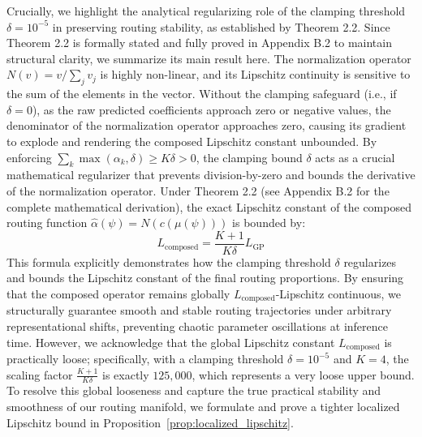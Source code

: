 Crucially, we highlight the analytical regularizing role of the clamping threshold $\delta = 10^{-5}$ in preserving routing stability, as established by Theorem 2.2. Since Theorem 2.2 is formally stated and fully proved in Appendix B.2 to maintain structural clarity, we summarize its main result here. The normalization operator $N(v) = v / \sum_j v_j$ is highly non-linear, and its Lipschitz continuity is sensitive to the sum of the elements in the vector. Without the clamping safeguard (i.e., if $\delta = 0$), as the raw predicted coefficients approach zero or negative values, the denominator of the normalization operator approaches zero, causing its gradient to explode and rendering the composed Lipschitz constant unbounded. By enforcing $\sum_k \max(\alpha_k, \delta) \ge K \delta > 0$, the clamping bound $\delta$ acts as a crucial mathematical regularizer that prevents division-by-zero and bounds the derivative of the normalization operator. Under Theorem 2.2 (see Appendix B.2 for the complete mathematical derivation), the exact Lipschitz constant of the composed routing function $\hat{\alpha}(\psi) = N(c(\mu(\psi)))$ is bounded by:
\begin{equation}
L_{\text{composed}} = \frac{K+1}{K \delta} L_{\text{GP}}
\label{eq:composed_lipschitz}
\end{equation}
This formula explicitly demonstrates how the clamping threshold $\delta$ regularizes and bounds the Lipschitz constant of the final routing proportions. By ensuring that the composed operator remains globally $L_{\text{composed}}$-Lipschitz continuous, we structurally guarantee smooth and stable routing trajectories under arbitrary representational shifts, preventing chaotic parameter oscillations at inference time. However, we acknowledge that the global Lipschitz constant $L_{\text{composed}}$ is practically loose; specifically, with a clamping threshold $\delta = 10^{-5}$ and $K=4$, the scaling factor $\frac{K+1}{K \delta}$ is exactly $125,000$, which represents a very loose upper bound. To resolve this global looseness and capture the true practical stability and smoothness of our routing manifold, we formulate and prove a tighter localized Lipschitz bound in Proposition~\ref{prop:localized_lipschitz}.

